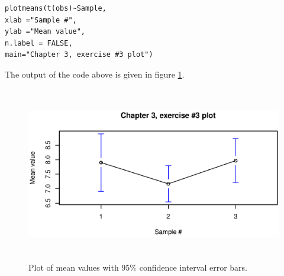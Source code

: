 \begin{enumerate}
\begin{lstlisting}
plotmeans(t(obs)~Sample, 
xlab ="Sample #", 
ylab ="Mean value",
n.label = FALSE,
main="Chapter 3, exercise #3 plot")
\end{lstlisting}

The output of the code above is given in figure \ref{Ex3}.

\begin{figure}
	\includegraphics[height=3in, width=\linewidth]{Ex3plot.eps}
	\caption{Plot of mean values with 95\% confidence interval error bars.}\label{Ex3}
\end{figure}
	
\end{enumerate} 